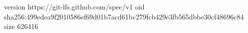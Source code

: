 version https://git-lfs.github.com/spec/v1
oid sha256:499edea9f2010586ef69d01b7acd61bc279fcb429e3fb565dbbe30cf48696c84
size 626416
